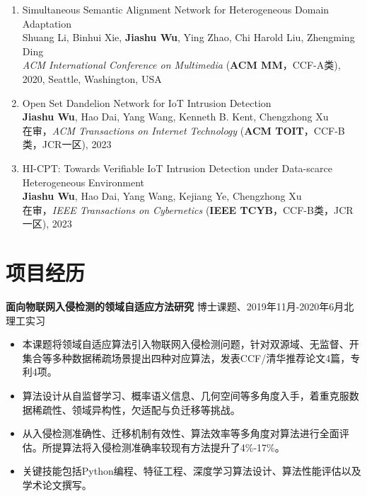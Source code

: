 \documentclass[letterpaper,11pt]{article}
\begin{document}
\begin{enumerate}
  \item Simultaneous Semantic Alignment Network for Heterogeneous Domain Adaptation\\
  Shuang Li, Binhui Xie, \textbf{Jiashu Wu}, Ying Zhao, Chi Harold Liu\textsuperscript{\Letter}, Zhengming Ding\\
  \textit{ACM International Conference on Multimedia} (\textbf{ACM MM}，CCF-A类), 2020, Seattle, Washington, USA

  \item Open Set Dandelion Network for IoT Intrusion Detection\\
  \textbf{Jiashu Wu}, Hao Dai, Yang Wang\textsuperscript{\Letter}, Kenneth B. Kent, Chengzhong Xu\\
  在审，\textit{ACM Transactions on Internet Technology} (\textbf{ACM TOIT}，CCF-B类，JCR一区), 2023

  \item HI-CPT: Towards Verifiable IoT Intrusion Detection under Data-scarce Heterogeneous Environment\\
  \textbf{Jiashu Wu}, Hao Dai, Yang Wang\textsuperscript{\Letter}, Kejiang Ye, Chengzhong Xu\\
  在审，\textit{IEEE Transactions on Cybernetics} (\textbf{IEEE TCYB}，CCF-B类，JCR一区), 2023
\end{enumerate}




\section{项目经历}

\textbf{面向物联网入侵检测的领域自适应方法研究} \hfill 博士课题、2019年11月-2020年6月北理工实习

\begin{itemize}
  \setlength\itemsep{2pt}
  \item 本课题将领域自适应算法引入物联网入侵检测问题，针对双源域、无监督、开集合等多种数据稀疏场景提出四种对应算法，发表CCF/清华推荐论文4篇，专利4项。
  \item 算法设计从自监督学习、概率语义信息、几何空间等多角度入手，着重克服数据稀疏性、领域异构性，欠适配与负迁移等挑战。
  \item 从入侵检测准确性、迁移机制有效性、算法效率等多角度对算法进行全面评估。所提算法将入侵检测准确率较现有方法提升了4\%-17\%。
  \item 关键技能包括Python编程、特征工程、深度学习算法设计、算法性能评估以及学术论文撰写。
\end{itemize}
\end{document}
